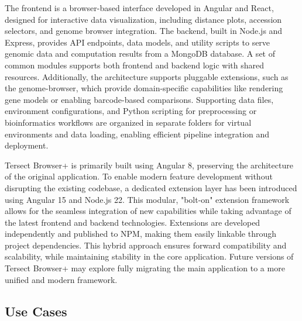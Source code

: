\documentclass[12pt]{article}
\begin{document}
The frontend is a browser-based interface developed in Angular and React, designed for interactive data visualization, including distance plots, accession selectors, and genome browser integration. The backend, built in Node.js and Express, provides API endpoints, data models, and utility scripts to serve genomic data and computation results from a MongoDB database. A set of common modules supports both frontend and backend logic with shared resources. Additionally, the architecture supports pluggable extensions, such as the genome-browser, which provide domain-specific capabilities like rendering gene models or enabling barcode-based comparisons. Supporting data files, environment configurations, and Python scripting for preprocessing or bioinformatics workflows are organized in separate folders for virtual environments and data loading, enabling efficient pipeline integration and deployment.


Tersect Browser+ is primarily built using Angular 8, preserving the architecture of the original application. To enable modern feature development without disrupting the existing codebase, a dedicated extension layer has been introduced using Angular 15 and Node.js 22. This modular, "bolt-on" extension framework allows for the seamless integration of new capabilities while taking advantage of the latest frontend and backend technologies. Extensions are developed independently and published to NPM, making them easily linkable through project dependencies. This hybrid approach ensures forward compatibility and scalability, while maintaining stability in the core application. Future versions of Tersect Browser+ may explore fully migrating the main application to a more unified and modern framework.

\subsection{Use Cases}
\end{document}
